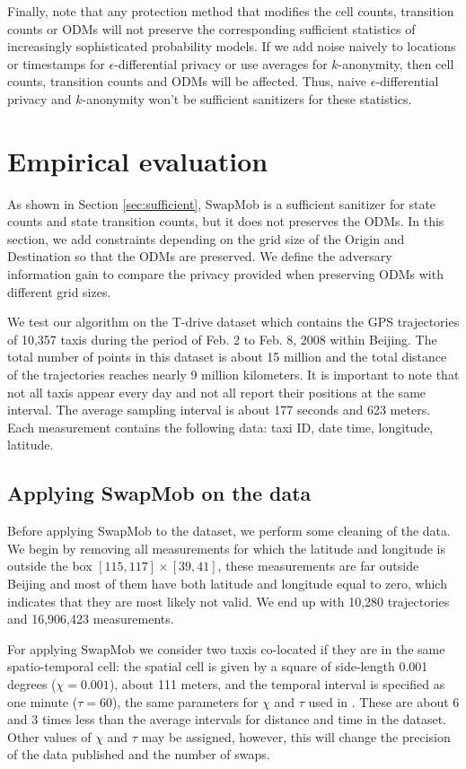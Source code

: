 \documentclass[times,twocolumn,final,authoryear]{elsarticle}
\begin{document}
{\color{blue}
Finally, note that any protection method that modifies the cell counts, transition counts or ODMs will not preserve the corresponding sufficient statistics of increasingly sophisticated probability models.  
If we add noise naively to locations or timestamps for $\epsilon$-differential privacy or use averages for $k$-anonymity, then cell counts, transition counts and ODMs will be affected.  Thus, naive $\epsilon$-differential privacy and $k$-anonymity won't be sufficient sanitizers for these statistics.
}

\section{Empirical evaluation}\label{Sec:evaluation}
{\color{blue}
As shown in Section \ref{sec:sufficient}, SwapMob is a sufficient sanitizer for state counts and state transition counts, but it does not preserves the ODMs.
In this section, we add constraints depending on the grid size of the Origin and Destination so that the ODMs are preserved. 
We define the adversary information gain to compare the privacy provided when preserving ODMs with different grid sizes.
}

We test our algorithm on the T-drive dataset
\citep{Yuan2010,Yuan2011} which contains the GPS trajectories of
10,357 taxis during the period of Feb. 2 to Feb. 8, 2008 within
Beijing. The total number of points in this dataset is about 15
million and the total distance of the trajectories reaches nearly 9
million kilometers. It is important to note that not all taxis appear
every day and not all report their positions at the same interval. The
average sampling interval is about 177 seconds and 623 meters. Each
measurement contains the following data: taxi ID, date time,
longitude, latitude.

\subsection{Applying SwapMob on the data}
Before applying SwapMob to the dataset, we perform some cleaning of the
data. We begin by removing all measurements for which the latitude and
longitude is outside the box $[115, 117] \times [39, 41]$, these
measurements are far outside Beijing and most of them have both
latitude and longitude equal to zero, which indicates that they
are most likely not valid. We end up with 10,280 trajectories and 16,906,423
measurements.

For applying SwapMob we consider two taxis co-located if they are in
the same spatio-temporal cell: the spatial cell is given by a square of side-length 0.001 degrees ($\chi = 0.001$), about 111
meters, and the temporal interval is specified as one minute ($\tau = 60$), 
{\color{blue} the same parameters for $\chi$ and $\tau$ used in \cite{Salas:2018-c}.
These are about 6 and 3 times less than the average intervals for distance and time in the dataset.
Other values of $\chi$ and $\tau$ may be assigned, however, this will change the precision of the data published and the number of swaps.}
\end{document}
